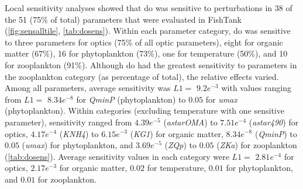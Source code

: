 \documentclass[review]{elsarticle}\usepackage[]{graphicx}\usepackage[]{color}
\begin{document}
Local sensitivity analyses showed that \ac{do} was sensitive to perturbations in 38 of the 51 (75\% of total) parameters that were evaluated in FishTank (\cref{fig:sensalltile}, \cref{tab:dosens}). Within each parameter category, \ac{do} was sensitive to three parameters for optics (75\% of all optic parameters), eight for organic matter (67\%), 16 for phytoplankton (73\%), one for temperature (50\%), and 10 for zooplankton (91\%). Although \ac{do} had the greatest sensitivity to parameters in the zooplankton category (as percentage of total), the relative effects varied. Among all parameters, average sensitivity was $L1 = $ $9.2e^{-3}$ with values ranging from $L1 = $ $8.34e^{-8}$ for \textit{QminP} (phytoplankton) to $0.05$ for \textit{umax} (phytoplankton). Within categories (excluding temperature with one sensitive parameter), sensitivity ranged from $4.39e^{-5}$ (\textit{astarOMA}) to $7.51e^{-4}$ (\textit{astar490}) for optics, $4.17e^{-4}$ (\textit{KNH4}) to $6.15e^{-3}$ (\textit{KG1}) for organic matter, $8.34e^{-8}$ (\textit{QminP}) to $0.05$ (\textit{umax}) for phytoplankton, and $3.69e^{-5}$ (\textit{ZQp}) to $0.05$ (\textit{ZKa}) for zooplankton (\cref{tab:dosens}).  Average sensitivity values in each category were $L1 = $ $2.81e^{-4}$ for optics, $2.17e^{-3}$ for organic matter, $0.02$ for temperature, $0.01$ for phytoplankton, and $0.01$ for zooplankton.
\end{document}
